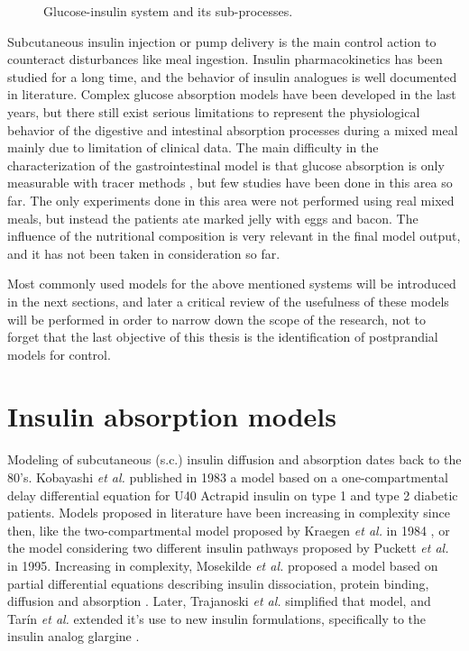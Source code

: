 \begin{figure}[hbtp]
\centering
{}\caption{Glucose-insulin system and its sub-processes.}
\label{fig:glucosemodels}
\end{figure}

Subcutaneous insulin injection or pump delivery is the main control action to counteract disturbances like meal ingestion. Insulin pharmacokinetics has been studied for a long time, and the behavior of insulin analogues is well documented in literature. Complex glucose absorption models have been developed in the last years, but there still exist serious limitations to represent the physiological behavior of the digestive and intestinal absorption processes during a mixed meal mainly due to limitation of clinical data. The main difficulty in the characterization of the gastrointestinal model is that glucose absorption is only measurable with tracer methods \cite{basu2003use}, but few studies have been done in this area so far. The only experiments done in this area were not performed using real mixed meals, but instead the patients ate marked jelly with eggs and bacon. The influence of the nutritional composition is very relevant in the final model output, and it has not been taken in consideration so far.

Most commonly used models for the above mentioned systems will be introduced in the next sections, and later a critical review of the usefulness of these models will be performed in order to narrow down the scope of the research, not to forget that the last objective of this thesis is the identification of postprandial models for control.

\section{Insulin absorption models}
\label{sec:InsulinPharmacokineticsModels}

Modeling of subcutaneous (s.c.) insulin diffusion and absorption dates back to the 80's. Kobayashi \textit{et al.} published in 1983 a model based on a one-compartmental delay differential equation for U40 Actrapid insulin \cite{kobayashi1983pharmacokinetics} on type 1 and type 2 diabetic patients. Models proposed in literature have been increasing in complexity since then, like the two-compartmental model proposed by Kraegen \textit{et al.} in 1984 \cite{kraegen1984insulin}, or the model considering two different insulin pathways proposed by Puckett \textit{et al.} \cite{puckett1995model} in 1995. Increasing in complexity, Mosekilde \textit{et al.} proposed a model based on partial differential equations describing insulin dissociation, protein binding, diffusion and absorption \cite{Mosekilde1989modeling}. Later, Trajanoski \textit{et al.} simplified that model, and Tar\'in \textit{et al.} extended it's use to new insulin formulations, specifically to the insulin analog glargine \cite{tarin2005comprehensive}.

